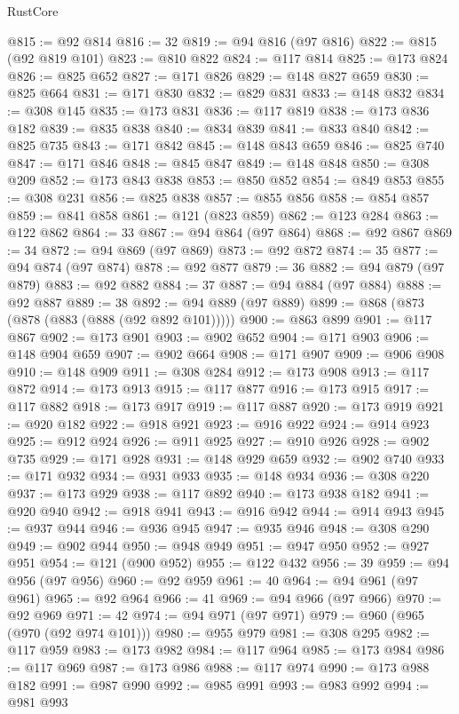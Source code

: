\begin{lexlean}{RustCore}
\begin{coremodule}
@815 := @92 @814
@816 := 32
@819 := @94 @816 (@97 @816)
@822 := @815 (@92 @819 @101)
@823 := @810 @822
@824 := @117 @814
@825 := @173 @824
@826 := @825 @652
@827 := @171 @826
@829 := @148 @827 @659
@830 := @825 @664
@831 := @171 @830
@832 := @829 @831
@833 := @148 @832
@834 := @308 @145
@835 := @173 @831
@836 := @117 @819
@838 := @173 @836 @182
@839 := @835 @838
@840 := @834 @839
@841 := @833 @840
@842 := @825 @735
@843 := @171 @842
@845 := @148 @843 @659
@846 := @825 @740
@847 := @171 @846
@848 := @845 @847
@849 := @148 @848
@850 := @308 @209
@852 := @173 @843 @838
@853 := @850 @852
@854 := @849 @853
@855 := @308 @231
@856 := @825 @838
@857 := @855 @856
@858 := @854 @857
@859 := @841 @858
@861 := @121 (@823 @859)
@862 := @123 @284
@863 := @122 @862
@864 := 33
@867 := @94 @864 (@97 @864)
@868 := @92 @867
@869 := 34
@872 := @94 @869 (@97 @869)
@873 := @92 @872
@874 := 35
@877 := @94 @874 (@97 @874)
@878 := @92 @877
@879 := 36
@882 := @94 @879 (@97 @879)
@883 := @92 @882
@884 := 37
@887 := @94 @884 (@97 @884)
@888 := @92 @887
@889 := 38
@892 := @94 @889 (@97 @889)
@899 := @868 (@873 (@878 (@883 (@888 (@92 @892 @101)))))
@900 := @863 @899
@901 := @117 @867
@902 := @173 @901
@903 := @902 @652
@904 := @171 @903
@906 := @148 @904 @659
@907 := @902 @664
@908 := @171 @907
@909 := @906 @908
@910 := @148 @909
@911 := @308 @284
@912 := @173 @908
@913 := @117 @872
@914 := @173 @913
@915 := @117 @877
@916 := @173 @915
@917 := @117 @882
@918 := @173 @917
@919 := @117 @887
@920 := @173 @919
@921 := @920 @182
@922 := @918 @921
@923 := @916 @922
@924 := @914 @923
@925 := @912 @924
@926 := @911 @925
@927 := @910 @926
@928 := @902 @735
@929 := @171 @928
@931 := @148 @929 @659
@932 := @902 @740
@933 := @171 @932
@934 := @931 @933
@935 := @148 @934
@936 := @308 @220
@937 := @173 @929
@938 := @117 @892
@940 := @173 @938 @182
@941 := @920 @940
@942 := @918 @941
@943 := @916 @942
@944 := @914 @943
@945 := @937 @944
@946 := @936 @945
@947 := @935 @946
@948 := @308 @290
@949 := @902 @944
@950 := @948 @949
@951 := @947 @950
@952 := @927 @951
@954 := @121 (@900 @952)
@955 := @122 @432
@956 := 39
@959 := @94 @956 (@97 @956)
@960 := @92 @959
@961 := 40
@964 := @94 @961 (@97 @961)
@965 := @92 @964
@966 := 41
@969 := @94 @966 (@97 @966)
@970 := @92 @969
@971 := 42
@974 := @94 @971 (@97 @971)
@979 := @960 (@965 (@970 (@92 @974 @101)))
@980 := @955 @979
@981 := @308 @295
@982 := @117 @959
@983 := @173 @982
@984 := @117 @964
@985 := @173 @984
@986 := @117 @969
@987 := @173 @986
@988 := @117 @974
@990 := @173 @988 @182
@991 := @987 @990
@992 := @985 @991
@993 := @983 @992
@994 := @981 @993

\end{coremodule}
\end{lexlean}
